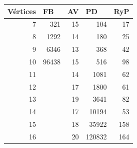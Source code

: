 \documentclass{article}
\begin{document}
\begin{table}[h]
    \centering
    \begin{tabular}{r|rrrr}
        \hline
        \multicolumn{1}{l}{\textbf{Vértices}} & \multicolumn{1}{l}{\textbf{FB}} & \multicolumn{1}{l}{\textbf{AV}} & \multicolumn{1}{l}{\textbf{PD}} & \multicolumn{1}{l}{\textbf{RyP}} \\ \hline \hline
        7                                     & 321                             & 15                              & 104                             & 17                               \\
        8                                     & 1292                            & 14                              & 180                             & 25                               \\
        9                                     & 6346                            & 13                              & 368                             & 42                               \\
        10                                    & 96438                           & 15                              & 516                             & 98                               \\
        11                                    &                                 & 14                              & 1081                            & 62                               \\
        12                                    &                                 & 17                              & 1800                            & 61                               \\
        13                                    &                                 & 19                              & 3641                            & 82                               \\
        14                                    &                                 & 17                              & 10194                           & 53                               \\
        15                                    &                                 & 18                              & 35922                           & 158                              \\
        16                                    &                                 & 20                              & 120832                          & 164                              \\

\end{tabular}
\end{table}
\end{document}
